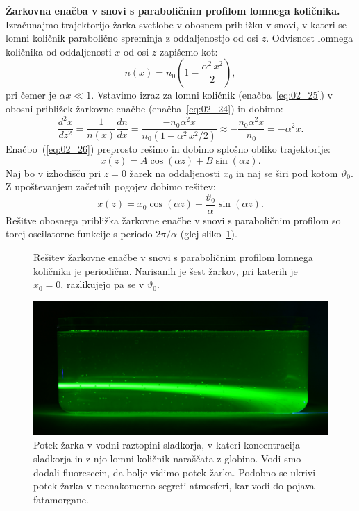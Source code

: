 \begin{example}
{\bf Žarkovna enačba v snovi s paraboličnim profilom
lomnega količnika.} Izračunajmo trajektorijo žarka svetlobe v 
obosnem približku v snovi, v kateri se lomni količnik parabolično 
spreminja z oddaljenostjo od osi $z$.  Odvisnost lomnega količnika 
od oddaljenosti $x$ od osi $z$ zapišemo kot:
\begin{equation}
 n(x) = n_0 \left(1-\frac{\alpha^2\,x^2}{2}\right)\!,
 \label{eq:02_25}
\end{equation}
pri čemer je $\alpha x \ll 1$.
Vstavimo izraz za lomni količnik (enačba~\ref{eq:02_25}) v obosni približek
žarkovne enačbe (enačba~\ref{eq:02_24}) in dobimo:
\begin{equation}
 \frac{d^2x}{dz^2}= \frac{1}{n(x)}\frac{dn}{dx} = 
 \frac{-n_0 \alpha^2x}{n_0 \left(1-\alpha^2\,x^2/2\right)} 
 \approx -\frac{n_0\alpha^2x}{n_0} = -\alpha^2x.
 \label{eq:02_26}
\end{equation}
Enačbo~(\ref{eq:02_26}) preprosto rešimo in dobimo splošno 
obliko trajektorije:
\begin{equation}
 x(z) = A \cos (\alpha z) + B \sin (\alpha z).
  \label{eq:02_27}
\end{equation}
Naj bo v izhodišču pri $z=0$ žarek na oddaljenosti $x_0$ 
in naj se širi pod kotom $\vartheta_0$. 
Z upoštevanjem začetnih pogojev dobimo rešitev:
\begin{equation}
x (z) = x_0 \cos(\alpha z) + \frac{\vartheta_0}{\alpha} \sin (\alpha z).
 \label{eq:02_28}
\end{equation}
Rešitve obosnega približka žarkovne enačbe v snovi s paraboličnim profilom 
so torej oscilatorne funkcije s periodo $2\pi/\alpha$ (glej sliko~\ref{fig:02_FerPar}).
\begin{figure}[ht]
\centering
\def\svgwidth{100truemm} 

\caption{Rešitev žarkovne enačbe v snovi s paraboličnim profilom lomnega
količnika je periodična. Narisanih
je šest žarkov, pri katerih je $x_0=0$, razlikujejo pa se v $\vartheta_0$.}
\label{fig:02_FerPar}
\end{figure}

\begin{figure}[ht]
\centering
\includegraphics[width=10truecm]{slike/02_Sladkor.jpg}
\caption{Potek žarka v vodni raztopini sladkorja, v kateri koncentracija sladkorja in z
njo lomni količnik naraščata z globino. Vodi smo dodali fluorescein, da bolje vidimo potek žarka. Podobno se ukrivi potek žarka v neenakomerno segreti atmosferi, kar vodi
do pojava fatamorgane.}
\label{fig:02_Sladkor}
\end{figure}
\end{example}

